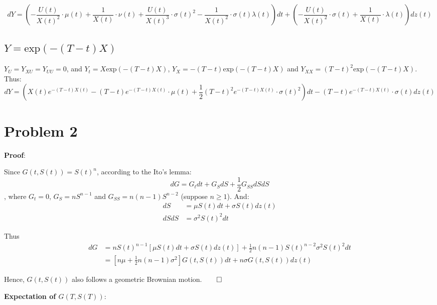 \documentclass{article}
\begin{document}
\begin{equation}
  dY = \left( -\frac{U(t)}{X(t)^2} \cdot \mu(t) + \frac{1}{X(t)} \cdot \nu(t) + \frac{U(t)}{X(t)^3} \cdot \sigma(t)^2 - \frac{1}{X(t)^2} \cdot  \sigma(t) \lambda(t) \right) dt + \left( -\frac{U(t)}{X(t)^2} \cdot  \sigma(t) + \frac{1}{X(t)} \cdot \lambda(t) \right) dz(t)
\end{equation}

\subsection{{
\(Y = \text{exp} (-(T-t)X)\)}}
\(Y_U = Y_{XU} = Y_{UU} = 0\), and
\(Y_t = X \text{exp} (-(T-t)X)\), \(Y_X = -(T-t) \text{exp} (-(T-t)X)\)
and \(Y_{XX} = (T-t)^2 \text{exp} (-(T-t)X)\). Thus:
\begin{equation}
  dY = \left( X(t) e^{-(T-t)X(t)} -(T-t) e^{-(T-t)X(t)} \cdot \mu(t) + \frac{1}{2} (T-t)^2 e^{-(T-t)X(t)} \cdot \sigma(t)^2 \right) dt - (T-t) e^{-(T-t)X(t)} \cdot  \sigma(t) dz(t)
\end{equation}

\section{Problem 2}\label{problem-2}

\textbf{Proof}:

Since \(G(t, S(t)) = S(t)^n\), according to the Ito's lemma:
\begin{equation}
  dG = G_t dt + G_S dS + \frac{1}{2} G_{SS} dS dS
\end{equation}
, where
\(G_t = 0\), \(G_S = nS^{n-1}\) and \(G_{SS} = n(n-1)S^{n-2}\) (suppose
\(n \geq 1\)). And:
\begin{align}
dS & = \mu S(t) dt + \sigma S(t) dz(t) \\
dS dS & = \sigma^2 S(t)^2 dt
\end{align}


Thus 
\begin{align}
dG & = nS(t)^{n-1} \left[ \mu S(t) dt + \sigma S(t) dz(t) \right] + \frac{1}{2} n(n-1)S(t)^{n-2} \sigma^2 S(t)^2 dt \\
& = \left[ n \mu + \frac{1}{2} n(n-1) \sigma^2 \right] G(t, S(t)) dt + n \sigma G(t, S(t))dz(t)
\end{align}


Hence, \(G(t, S(t))\) also follows a geometric Brownian motion.$\qed$

\textbf{Expectation of \(G(T, S(T))\)}:
\end{document}
